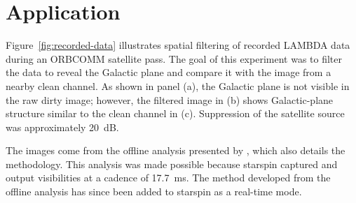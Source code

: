 \documentclass[11pt,twoside]{article}
\begin{document}
\section{Application}


Figure~\ref{fig:recorded-data} illustrates spatial filtering of recorded LAMBDA
data during an ORBCOMM satellite pass. The goal of this experiment was to filter the data to reveal the Galactic plane
and compare it with the image from a nearby clean channel. As shown in panel (a), the Galactic plane is not visible in the raw dirty image; however,
the filtered image in (b) shows Galactic-plane structure similar to the clean channel in (c). Suppression of the satellite source was approximately 20~dB.

The images come from the offline analysis presented by \citet{smallwood_protecting_2026}, which also details the methodology.
This analysis was made possible because starspin captured and output visibilities at a cadence of 17.7~ms. The method developed from the offline analysis
has since been added to starspin as a real-time mode.
\end{document}
